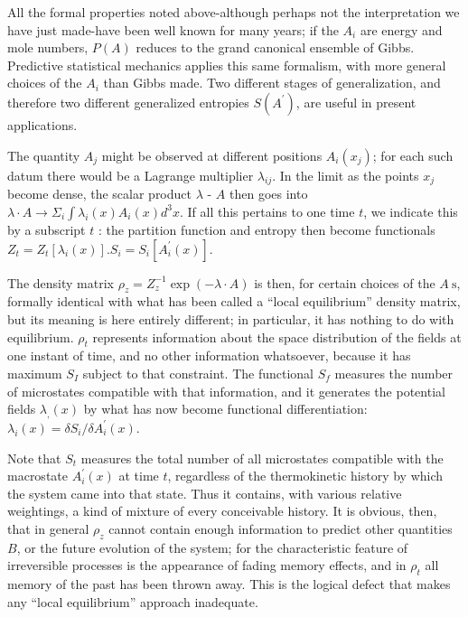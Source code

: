 \documentclass{article}
\begin{document}
All the formal properties noted above-although perhaps not the interpretation we have just made-have been well known for many years; if the $A_i$ are energy and mole numbers, $P(A)$ reduces to the grand canonical ensemble of Gibbs. Predictive statistical mechanics applies this same formalism, with more general choices of the $A_i$ than Gibbs made. Two different stages of generalization, and therefore two different generalized entropies $S\left(A^{\prime}\right)$, are useful in present applications.

The quantity $A_j$ might be observed at different positions $A_i\left(x_j\right)$; for each such datum there would be a Lagrange multiplier $\lambda_{i j}$. In the limit as the points $x_j$ become dense, the scalar product $\lambda$ - $A$ then goes into $\lambda \cdot A \rightarrow \Sigma_i \int \lambda_i(x) A_i(x) d^3 x$. If all this pertains to one time $t$, we indicate this by a subscript $t$ : the partition function and entropy then become functionals $Z_t=Z_t\left[\lambda_i(x)\right] . S_i=S_i\left[A_i^{\prime}(x)\right]$.

The density matrix $\rho_z=Z_z^{-1} \exp (-\lambda \cdot A)$ is then, for certain choices of the $A \mathrm{~s}$, formally identical with what has been called a ``local equilibrium'' density matrix, but its meaning is here entirely different; in particular, it has nothing to do with equilibrium. $\rho_t$ represents information about the space distribution of the fields at one instant of time, and no other information whatsoever, because it has maximum $S_I$ subject to that constraint. The functional $S_f$ measures the number of microstates compatible with that information, and it generates the potential fields $\lambda_{,}(x)$ by what has now become functional differentiation: $\lambda_i(x)=\delta S_i / \delta A_i^{\prime}(x)$.

Note that $S_t$ measures the total number of all microstates compatible with the macrostate $A_i^{\prime}(x)$ at time $t$, regardless of the thermokinetic history by which the system came into that state. Thus it contains, with various relative weightings, a kind of mixture of every conceivable history. It is obvious, then, that in general $\rho_z$ cannot contain enough information to predict other quantities $B$, or the future evolution of the system; for the characteristic feature of irreversible processes is the appearance of fading memory effects, and in $\rho_t$ all memory of the past has been thrown away. This is the logical defect that makes any ``local equilibrium'' approach inadequate.
\end{document}
